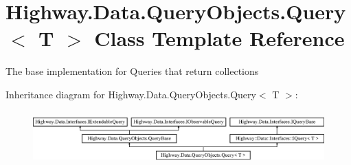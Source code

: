 \hypertarget{class_highway_1_1_data_1_1_query_objects_1_1_query-g}{\section{Highway.\-Data.\-Query\-Objects.\-Query$<$ T $>$ Class Template Reference}
\label{class_highway_1_1_data_1_1_query_objects_1_1_query-g}
}


The base implementation for Queries that return collections  


Inheritance diagram for Highway.\-Data.\-Query\-Objects.\-Query$<$ T $>$\-:\begin{figure}[H]
\begin{center}
\leavevmode
\includegraphics[height=2.089552cm]{class_highway_1_1_data_1_1_query_objects_1_1_query-g}
\end{center}
\end{figure}

